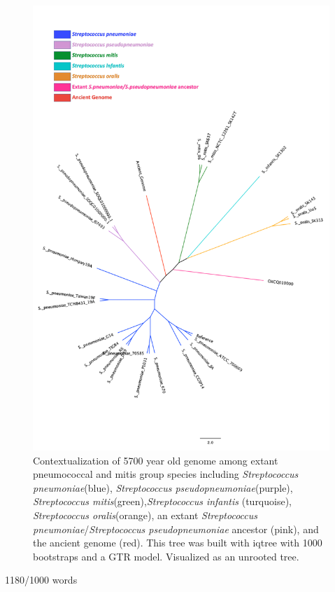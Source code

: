 \documentclass{article}
\begin{document}
\begin{figure}[H]
\centering
    \includegraphics[width=\textwidth]{newMRCA.pdf}
    \caption{Contextualization of 5700 year old genome among extant pneumococcal and mitis group species including \textit{Streptococcus pneumoniae}(blue), \textit{Streptococcus pseudopneumoniae}(purple), \textit{Streptococcus mitis}(green),\textit{Streptococcus infantis} (turquoise), \textit{Streptococcus oralis}(orange), an extant \textit{Streptococcus pneumoniae}/\textit{Streptococcus pseudopneumoniae} ancestor (pink), and the ancient genome (red). This tree was built with iqtree with 1000 bootstraps and a GTR model. Visualized as an unrooted tree.}
      \label{fig:extantancient}
\end{figure}
1180/1000 words
\end{document}
